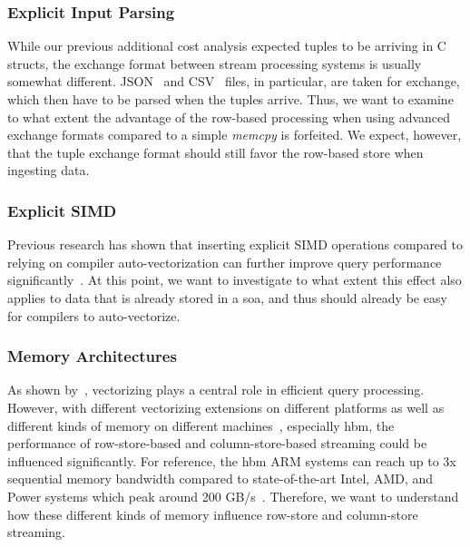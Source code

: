 \subsubsection{Explicit Input Parsing}
While our previous additional cost analysis expected tuples to be arriving in C structs, the exchange format between stream processing systems is usually somewhat different.
JSON~\cite{DBLP:journals/pvldb/PalkarABZ18,DBLP:journals/vldb/LangdaleL19,DBLP:journals/pvldb/LiKCGK17} and CSV~\cite{DBLP:journals/pvldb/MuhlbauerRSRK013,DBLP:conf/sigmod/0002LECK19,DBLP:journals/pvldb/StehleJ20} files, in particular, are taken for exchange, which then have to be parsed when the tuples arrive.
Thus, we want to examine to what extent the advantage of the row-based processing when using advanced exchange formats compared to a simple \emph{memcpy} is forfeited.
We expect, however, that the tuple exchange format should still favor the row-based store when ingesting data.

\subsubsection{Explicit SIMD}

Previous research has shown that inserting explicit SIMD operations compared to relying on compiler auto-vectorization can further improve query performance significantly~\cite{DBLP:journals/pvldb/KerstenLKNPB18}.
At this point, we want to investigate to what extent this effect also applies to data that is already stored in a \ac{soa}, and thus should already be easy for compilers to auto-vectorize.

\subsubsection{Memory Architectures}

As shown by~\citet{DBLP:journals/pvldb/KerstenLKNPB18}, vectorizing plays a central role in efficient query processing.
However, with different vectorizing extensions on different platforms as well as different kinds of memory on different machines~\cite[]{bollmeier2021processor}, especially \ac{hbm}, the performance of row-store-based and column-store-based streaming could be influenced significantly.
For reference, the \ac{hbm} ARM systems can reach up to 3x sequential memory bandwidth compared to state-of-the-art Intel, AMD, and Power systems which peak around 200 GB/s~\cite[]{bollmeier2021processor}.
Therefore, we want to understand how these different kinds of memory influence row-store and column-store streaming.

